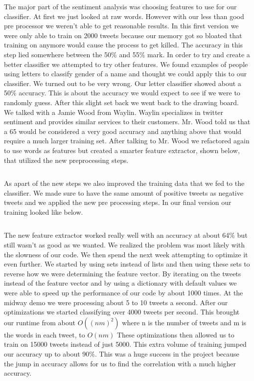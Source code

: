 \documentclass{acm_proc_article-sp}
\begin{document}
The major part of the sentiment analysis was choosing features to use for our
classifier. At first we just looked at raw words. However with our less than 
good pre processor we weren't able to get reasonable results. In this first version
we were only able to train on 2000 tweets because our memory got so bloated 
that training on anymore would cause the process to get killed. The accuracy in this step
lied somewhere between the 50\% and 55\% mark. In order to try and create 
a better classifier we attempted to try other features. We found examples
of people using letters to classify gender of a name and thought we could apply
this to our classifier. We turned out to be very wrong. Our letter classifier showed about 
a 50\% accuracy. This is about the accuracy we would expect to see if we were
to randomly guess. After this slight set back we went back to the drawing board. 
We talked with a Jamie Wood from Waylin. Waylin specializes in twitter sentiment 
and provides similar services to their customers. Mr. Wood told us that a 65%
would be considered a very good accuracy and anything above that would require a much
larger training set. After talking to Mr. Wood we refactored again to use words as features
but created a smarter feature extractor, shown below, that utilized the new preprocessing steps.

\inputminted{python}{examples/featureExtractor.py}

As apart of the new steps we also improved the training data that we fed to the classifier. 
We made sure to have the same amount of positive tweets as negative tweets and we
applied the new pre processing steps. In our final version our training looked like below.

\break
\inputminted{python}{examples/train.py}

The new feature extractor worked really well with an accuracy at about 64\% 
but still wasn't as good as we wanted. We realized the problem was most likely
with the slowness of our code. We then spend the next week attempting to 
optimize it even further. We started by using sets instead of lists and then using these
sets to reverse how we were determining the feature vector. By iterating on the tweets
instead of the feature vector and by using a dictionary with default values we were
able to speed up the performance of our code by about 1000 times. At the midway demo
we were processing about 5 to 10 tweets a second. After our optimizations we started
classifying over 4000 tweets per second. This brought our runtime from about $O((nm)^2)$ 
where n is the number of tweets and m is the words in each tweet, to $O(nm)$ These 
optimizations then allowed us
to train on 15000 tweets instead of just 5000. This extra volume of training jumped our
accuracy up to about 90\%. This was a huge success in the project because the 
jump in accuracy allows for us to find the correlation with a much higher accuracy. 
\end{document}
